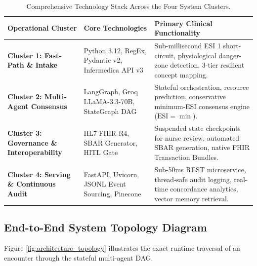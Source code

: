 \documentclass[11pt,a4paper]{article}
\begin{document}
\begin{table}[htbp]
\centering
\small
\begin{tabularx}{\textwidth}{l p{4.2cm} X}
\toprule
\textbf{Operational Cluster} & \textbf{Core Technologies} & \textbf{Primary Clinical Functionality} \\
\midrule
\textbf{Cluster 1: Fast-Path \& Intake} & 
Python 3.12, RegEx, Pydantic v2, Infermedica API v3 & 
Sub-millisecond ESI 1 short-circuit, physiological danger-zone detection, 3-tier resilient concept mapping. \\
\addlinespace
\textbf{Cluster 2: Multi-Agent Consensus} & 
LangGraph, Groq LLaMA-3.3-70B, StateGraph DAG & 
Stateful orchestration, resource prediction, conservative minimum-ESI consensus engine ($\text{ESI} = \min$). \\
\addlinespace
\textbf{Cluster 3: Governance \& Interoperability} & 
HL7 FHIR R4, SBAR Generator, HITL Gate & 
Suspended state checkpoints for nurse review, automated SBAR generation, native FHIR Transaction Bundles. \\
\addlinespace
\textbf{Cluster 4: Serving \& Continuous Audit} & 
FastAPI, Uvicorn, JSONL Event Sourcing, Pinecone & 
Sub-50ms REST microservice, thread-safe audit logging, real-time concordance analytics, vector memory retrieval. \\
\bottomrule
\end{tabularx}
\caption{Comprehensive Technology Stack Across the Four System Clusters.}
\label{tab:tech_stack}
\end{table}

\subsection{End-to-End System Topology Diagram}
Figure \ref{fig:architecture_topology} illustrates the exact runtime traversal of an encounter through the stateful multi-agent DAG.
\end{document}
